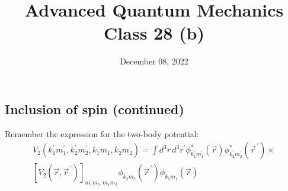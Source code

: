 \documentclass[12pt]{article}
\title{Advanced Quantum Mechanics\\Class 28 (b)}
\date{December 08, 2022}                                           %
\newcommand{\be}{\begin{equation}}
\newcommand{\ee}{\end{equation}}
\newcommand{\vecrp}{\ensuremath{\vec{r}^{\,\prime}}}
\begin{document}
\maketitle

\setcounter{section}{9}
\setcounter{subsection}{6}
\setcounter{equation}{136}


\subsection{Inclusion of spin (continued)}

Remember the expression for the two-body potential:
\be
\begin{gathered}
V_2(k_1^\prime m_1^\prime, k_2^\prime m_2^\prime, k_1 m_1, k_2 m_2)
= 
\int d^3r\,d^3r^\prime
\phi^*_{k_1^\prime m_1^\prime}(\vec{r})
\phi^*_{k_2^\prime m_2^\prime}(\vecrp)\times\\
[V_2(\vec{r},\vecrp)]_{m_1^\prime m_2^\prime, m_1 m_2}
\phi_{k_2 m_2}(\vecrp)
\phi_{k_1 m_1}(\vec{r})
\end{gathered}
\label{eq:g137}
\ee
\end{document}
